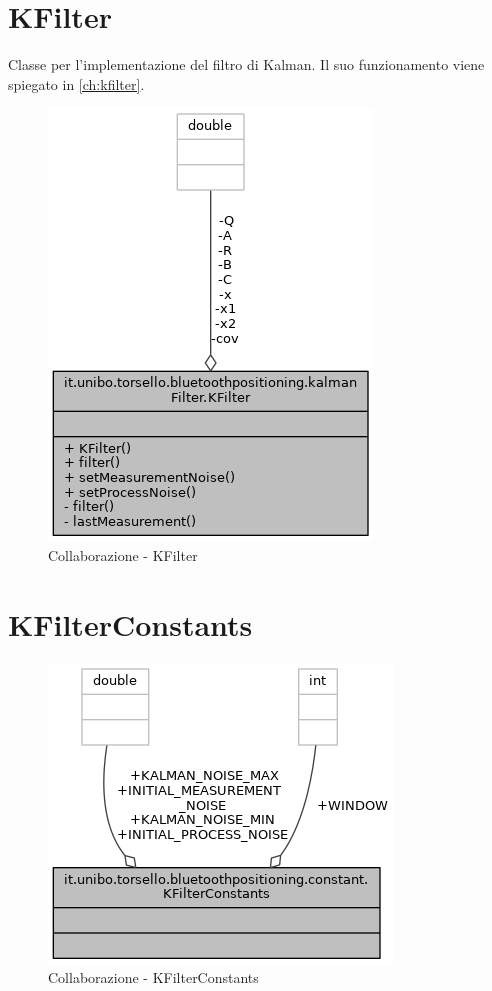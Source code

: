 \newpage
\section{KFilter}

Classe per l'implementazione del filtro di Kalman. Il suo funzionamento viene spiegato in \ref{ch:kfilter}.

\begin{figure}[ph]
	\centering
	\includegraphics[width=0.6\linewidth]{img/uml/class/classit_1_1unibo_1_1torsello_1_1bluetoothpositioning_1_1kalmanFilter_1_1KFilter__coll__graph.png}
	\caption{Collaborazione - KFilter}
\end{figure}

\newpage
\section{KFilterConstants}
\begin{figure}[ph]
	\centering
	\includegraphics[width=0.6\linewidth]{img/uml/class/classit_1_1unibo_1_1torsello_1_1bluetoothpositioning_1_1constant_1_1KFilterConstants__coll__graph.png}
	\caption{Collaborazione - KFilterConstants}
\end{figure}

